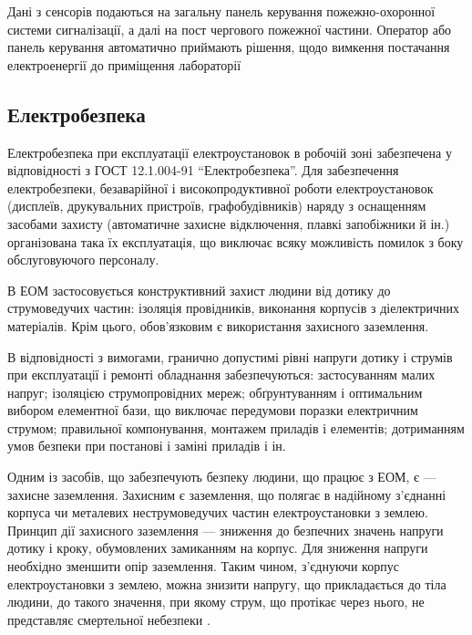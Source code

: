 Дані з сенсорів подаються на загальну панель керування пожежно-охоронної системи
сигналізації, а далі на пост чергового пожежної частини. Оператор або панель
керування автоматично приймають рішення, щодо вимкення постачання електроенергії
до приміщення лабораторії

\subsection{Електробезпека}
Електробезпека при експлуатації електроустановок в робочій зоні забезпечена у 
відповідності з ГОСТ 12.1.004-91 “Електробезпека”. Для забезпечення електробезпеки, 
безаварійної і високопродуктивної роботи електроустановок (дисплеїв, друкувальних 
пристроїв, графобудівників) наряду з оснащенням засобами захисту (автоматичне захисне 
відключення, плавкі запобіжники й ін.) організована така їх експлуатація, що виключає 
всяку можливість помилок з боку обслуговуючого персоналу.

В ЕОМ застосовується конструктивний захист людини від дотику до струмоведучих частин: 
ізоляція провідників, виконання корпусів з діелектричних матеріалів. Крім цього, 
обов'язковим є використання захисного заземлення.

В відповідності з вимогами, гранично допустимі рівні напруги дотику і 
струмів при експлуатації і ремонті обладнання забезпечуються: застосуванням малих напруг; ізоляцією струмопровідних мереж; 
обґрунтуванням і оптимальним вибором елементної бази, що виключає передумови 
поразки електричним струмом; правильної компонування, монтажем приладів і елементів; 
дотриманням умов безпеки при постанові і заміні приладів і ін.

Одним із засобів, що забезпечують безпеку людини, що працює з ЕОМ, є --- захисне заземлення. 
Захисним є заземлення, що полягає в надійному з'єднанні  корпуса чи  металевих неструмоведучих 
частин електроустановки з землею. Принцип дії захисного заземлення --- зниження до безпечних значень 
напруги дотику і кроку, обумовлених замиканням на корпус. Для зниження напруги необхідно зменшити 
опір заземлення. Таким чином, з'єднуючи корпус електроустановки з землею, можна знизити напругу, 
що прикладається до тіла людини, до такого значення, при якому струм, що протікає через нього, не 
представляє  смертельної небезпеки .



























